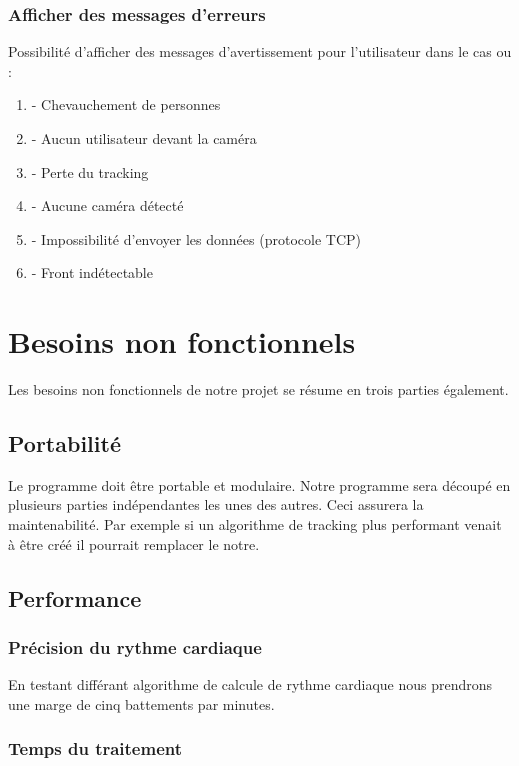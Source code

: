 \documentclass[12pt,a4paper]{article}
\begin{document}
\subsubsection{Afficher des messages d'erreurs}

Possibilité d'afficher des messages d'avertissement pour l'utilisateur dans le cas ou :

\begin{enumerate}
\item [] - Chevauchement de personnes
\item [] - Aucun utilisateur devant la caméra
\item [] - Perte du tracking
\item [] - Aucune caméra détecté 
\item [] - Impossibilité d'envoyer les données (protocole TCP)
\item [] - Front indétectable

\end{enumerate}



\section*{Besoins non fonctionnels}

Les besoins non fonctionnels de notre projet se résume en trois parties également.
\subsection{Portabilité}
Le programme doit être portable et modulaire. Notre programme sera découpé en plusieurs parties indépendantes les unes des autres. Ceci assurera la maintenabilité. Par exemple si un algorithme de tracking plus performant venait à être créé il pourrait remplacer le notre.

\subsection{Performance}

\subsubsection{Précision du rythme cardiaque}

En testant différant algorithme de calcule de rythme cardiaque nous prendrons une marge de cinq battements par minutes.
\subsubsection{Temps du traitement}
\end{document}
